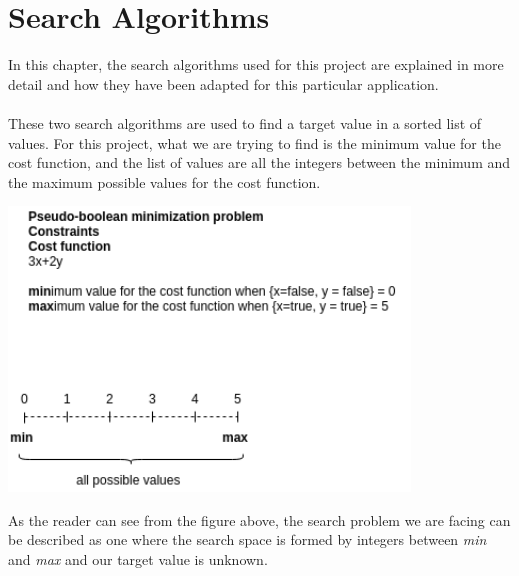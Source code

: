 
\chapter{Search Algorithms} %

\label{Chapter4} %

In this chapter, the search algorithms used for this project are explained in more detail and how they have been adapted for this particular application.\\\\
These two search algorithms are used to find a target value in a sorted list of values. For this project, what we are trying to find is the minimum value for the cost function, and the list of values are all the integers between the minimum and the maximum possible values for the cost function.

\begin{center}
	\includegraphics[width=0.8\textwidth]{Figures/Search_space.png}
	\label{search_space}
\end{center}
As the reader can see from the figure above, the search problem we are facing can be described as one where the search space is formed by integers between \emph{min} and \emph{max} and our target value is unknown.

